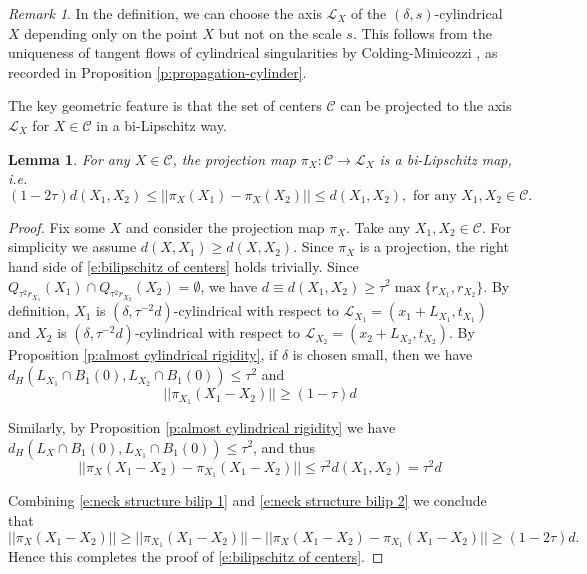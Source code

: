 \documentclass[11pt,reqno]{amsart}
\numberwithin{equation}{section}
\newcommand{\cC}{\mathcal{C}}
\newcommand{\cL}{\mathcal{L}}
\newtheorem{lemma}[equation]{Lemma}
\theoremstyle{definition}
\theoremstyle{remark}
\newtheorem{remark}[equation]{Remark}
\theoremstyle{remark}
\theoremstyle{remark}
\theoremstyle{remark}\newtheorem{conjecture}[equation]{Conjecture}
\theoremstyle{remark}\newtheorem{question}[equation]{Question}
\begin{document}
\begin{remark}
    In the definition, we can choose the axis $\mathcal{L}_{X}$ of the $(\delta,s)$-cylindrical $X$ depending only on the point $X$ but not on the scale $s$. This follows from the uniqueness of tangent flows of cylindrical singularities by Colding-Minicozzi \cite{CM15}, as recorded in Proposition \ref{p:propagation-cylinder}. 
\end{remark}

The key geometric feature is that the set of centers $\cC$ can be projected to the axis $\cL_X$ for $X \in \cC$ in a bi-Lipschitz way. 

\begin{lemma}\label{l:cylindrical region structure}
    For any $X\in \cC$, the projection map $\pi_X : \cC \to \cL_{X}$ is a bi-Lipschitz map, i.e. 
\begin{equation}\label{e:bilipschitz of centers}
    (1-2\tau)d(X_1,X_2) \le    ||\pi_X(X_1) - \pi_X(X_2)|| \le d(X_1,X_2), \text{ for any } X_1, X_2 \in \cC.
\end{equation}
\end{lemma}

\begin{proof}
    


Fix some $X$ and consider the projection map $\pi_X$. Take any $X_1, X_2 \in \cC$. For simplicity we assume $d(X,X_1) \ge d(X,X_2)$. Since $\pi_X$ is a projection, the right hand side of \eqref{e:bilipschitz of centers} holds trivially. Since $Q_{\tau^2 r_{X_1}}(X_1) \cap Q_{\tau^2 r_{X_2}}(X_2) = \emptyset$, we have $d\equiv d(X_1,X_2)\ge \tau^2 \max\{r_{X_1},r_{X_2}\}.$ By definition, $X_1$ is $(\delta,\tau^{-2}d)$-cylindrical with respect to $\cL_{X_1}=(x_1+L_{X_1}, t_{X_1})$ and $X_2$ is $(\delta,\tau^{-2}d)$-cylindrical with respect to $\cL_{X_2}= (x_2+ L_{X_2}, t_{X_2})$. By Proposition \ref{p:almost cylindrical rigidity}, if $\delta$ is chosen small, then we have $d_H(L_{X_1}\cap B_1(0), L_{X_2}\cap B_1(0)) \le \tau^2$ and
\begin{equation}\label{e:neck structure bilip 1}
    ||\pi_{X_1}(X_1 - X_2) || \ge (1-\tau) d
\end{equation}

Similarly, by Proposition \ref{p:almost cylindrical rigidity} we have $d_H(L_{X}\cap B_1(0), L_{X_1}\cap B_1(0)) \le \tau^2$, and thus 
\begin{equation}\label{e:neck structure bilip 2}
    ||\pi_X(X_1-X_2)   - \pi_{X_1}(X_1-X_2) || \le \tau^2 d(X_1,X_2) = \tau^2 d
\end{equation}

Combining \eqref{e:neck structure bilip 1} and \eqref{e:neck structure bilip 2} we conclude that
\begin{equation*}
    ||\pi_X(X_1-X_2)|| \ge ||\pi_{X_1}(X_1-X_2)|| - ||\pi_X(X_1-X_2) - \pi_{X_1}(X_1-X_2)|| \ge 
    (1-2\tau)d.
\end{equation*}
Hence this completes the proof of \eqref{e:bilipschitz of centers}.
\end{proof}
\end{document}
